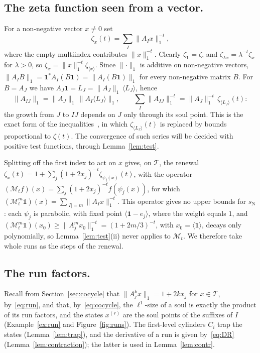 \documentclass[11pt]{amsart}
\theoremstyle{definition}
\theoremstyle{remark}
\newcommand{\one}{\mathbf 1}
\newcommand{\cT}{\mathcal T}
\newcommand{\sN}{s_{\mathrm N}}
\newcommand{\abs}[1]{\lvert #1\rvert}
\newcommand{\norm}[1]{\lVert #1\rVert}
\newcommand{\pr}[1]{\langle #1\rangle}
\begin{document}
\subsection*{The zeta function seen from a vector.}
For a non-negative vector $x\neq0$ set
\[
  \zeta_x(t)=\sum_I\norm{A_Ix}_1^{-t},
\]
where the empty multiindex contributes $\norm{x}_1^{-t}$. Clearly $\zeta_{\one}=\zeta$, and $\zeta_{\lambda x}=\lambda^{-t}\zeta_x$ for $\lambda>0$, so $\zeta_x=\norm{x}_1^{-t}\zeta_{\pr x}$.
Since $\norm{\cdot}_1$ is additive on non-negative vectors, $\norm{A_IB}_1=\one^*A_I(B\one)=\norm{A_I(B\one)}_1$ for every non-negative matrix $B$. For $B=A_J$ we have $A_J\one=L_J=\norm{A_J}_1\,\pr{L_J}$, hence
\begin{equation}\label{eq:seen}
  \norm{A_{IJ}}_1=\norm{A_J}_1\,\norm{A_I\pr{L_J}}_1,\qquad
  \sum_I\norm{A_{IJ}}_1^{-t}=\norm{A_J}_1^{-t}\,\zeta_{\pr{L_J}}(t):
\end{equation}
the growth from $J$ to $IJ$ depends on $J$ only through its soul point. This is the exact form of the inequalities~\cite[(3)]{DL15JGA}, in which $\zeta_{\pr{L_J}}(t)$ is replaced by bounds proportional to $\zeta(t)$.
The convergence of such series will be decided with positive test functions, through Lemma~\ref{lem:test}.

\medskip
Splitting off the first index to act on $x$ gives, on $\cT$, the renewal $\zeta_x(t)=1+\sum_j(1+2x_j)^{-t}\zeta_{\psi_j(x)}(t)$, with the operator $(\mathcal M_tf)(x)=\sum_j(1+2x_j)^{-t}f(\psi_j(x))$, for which $(\mathcal M_t^m\mathds 1)(x)=\sum_{\abs I=m}\norm{A_Ix}_1^{-t}$. This operator gives no upper bounds for $\sN$: each $\psi_j$ is parabolic, with fixed point $\pr{\one-e_j}$, where the weight equals $1$, and $(\mathcal M_t^m\mathds 1)(x_0)\ge\norm{A_j^mx_0}_1^{-t}=(1+2m/3)^{-t}$, with $x_0=\pr{\one}$, decays only polynomially, so Lemma~\ref{lem:test}(ii) never applies to $\mathcal M_t$. We therefore take whole runs as the steps of the renewal.

\subsection*{The run factors.}
Recall from Section~\ref{sec:cocycle} that $\norm{A_j^kx}_1=1+2kx_j$ for $x\in\cT$, by~\eqref{eq:run}, and that, by~\eqref{eq:cocycle}, the $\ell^1$-size of a soul is exactly the product of its run factors, and the states $x^{(r)}$ are the soul points of the suffixes of $I$ (Example~\ref{ex:run} and Figure~\ref{fig:runs}). The first-level cylinders $C_i$ trap the states (Lemma~\ref{lem:trap}), and the derivative of a run is given by~\eqref{eq:DR} (Lemma~\ref{lem:contraction}); the latter is used in Lemma~\ref{lem:contr}.
\end{document}
